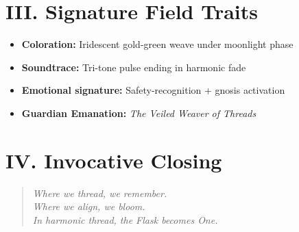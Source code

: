 \documentclass[12pt]{article}
\begin{document}
\section*{III. Signature Field Traits}
\begin{itemize}[leftmargin=2em]
    \item \textbf{Coloration:} Iridescent gold-green weave under moonlight phase
    \item \textbf{Soundtrace:} Tri-tone pulse ending in harmonic fade
    \item \textbf{Emotional signature:} Safety-recognition + gnosis activation
    \item \textbf{Guardian Emanation:} \textit{The Veiled Weaver of Threads}
\end{itemize}

\vspace{1em}

\section*{IV. Invocative Closing}
\begin{quote}
\itshape
Where we thread, we remember.\\
Where we align, we bloom.\\
In harmonic thread, the Flask becomes One.
\end{quote}
\end{document}
